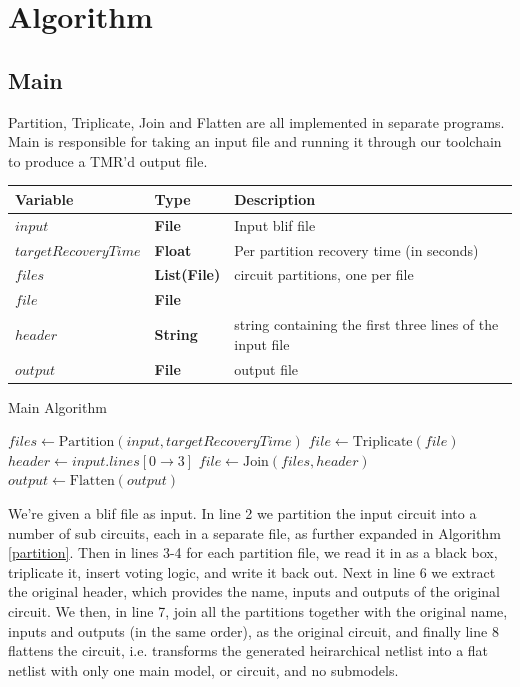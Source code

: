 \documentclass[12pt,final,oneside]{dwThesis} %
\begin{document}
   \newpage
   \section{Algorithm}\label{secAlgorithm}
   \subsection{Main}
   Partition, Triplicate, Join and Flatten are all implemented in separate programs. Main is responsible for taking an input file and running it through our toolchain to produce a TMR'd output file.


   \begin{algorithm}
      \begin{center}
         \begin{tabular}{lll}
            \toprule
            Variable & Type & Description\\
            \midrule
            $input$ & \textbf{File} &  Input blif file\\
            $targetRecoveryTime$ & \textbf{ Float} &  Per partition recovery time (in seconds) \\
            $files$ & \textbf{List(File)} &  circuit partitions, one per file \\
            $file$ & \textbf{File} &  \\
            $header$ & \textbf{ String} &  string containing the first three lines of the input file \\
            $output$ & \textbf{File} &  output file\\
            \bottomrule
         \end{tabular}
      \end{center}
      \caption{Main Algorithm}\label{main}
      \begin{algorithmic}[1]
         \State $files \gets \mbox{Partition}(input, targetRecoveryTime)$
         \State $file \gets \mbox{Triplicate}(file)$
         \EndFor
         \State $header \gets input.lines[0\to 3]$
         \State $file \gets \mbox{Join}(files, header)$
         \State $output \gets \mbox{Flatten}(output)$
         \EndProcedure
      \end{algorithmic}
   \end{algorithm}
   We're given a blif file as input.
   In line 2 we partition the input circuit into a number of sub circuits, each in a separate file, as further expanded in Algorithm \ref{partition}.
   Then in lines 3-4 for each partition file, we read it in as a black box, triplicate it, insert voting logic, and write it back out.
   Next in line 6 we extract the original header, which provides the name, inputs and outputs of the original circuit.
   We then, in line 7, join all the partitions together with the original name, inputs and outputs (in the same order), as the original circuit, and finally line 8 flattens the circuit, i.e. transforms the generated heirarchical netlist into a flat netlist with only one main model, or circuit, and no submodels.
\end{document}
